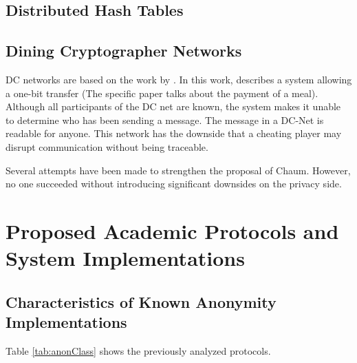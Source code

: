 \section{Distributed Hash Tables}

\section{Dining Cryptographer Networks}
DC networks are based on the work  by \citeauthor{chaum-dc}\cite{chaum-dc}. In this work, \citeauthor{chaum-dc} describes a system allowing a one-bit transfer (The specific paper talks about the payment of a meal). Although all participants of the DC net are known, the system makes it unable to determine who has been sending a message. The message in a DC-Net is readable for anyone. This network has the downside that a cheating player may disrupt communication without being traceable.

Several attempts have been made to strengthen the proposal of Chaum\cite{golle:eurocrypt2004,disco,herbivore:tr,Corrigan-Gibbs:2010:DAA:1866307.1866346}. However, no one succeeded without introducing significant downsides on the privacy side.

\chapter{Proposed Academic Protocols and System Implementations}
\section{Characteristics of Known Anonymity Implementations}
Table \ref{tab:anonClass} shows the previously analyzed protocols.

